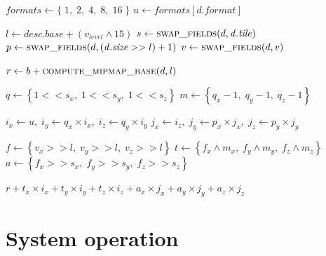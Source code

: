 \begin{algorithm}[H]
\footnotesize
\caption{compute address using array unit descriptor and coordinate vector}
\begin{algorithmic}[1]

  \State $\mathit{formats} \gets \{\;1,\;2,\;4,\;8,\;16\;\}$
  \State $u \gets \mathit{formats}[\mathit{d.format}]$

  \State $l \gets \mathit{desc.base} + (v_{level} \land 15)$
  \State $s \gets \Call{swap\_fields}{d, \mathit{d.tile}}$
  \State $p \gets \Call{swap\_fields}{d, (\mathit{d.size} >> l) + 1}$
  \State $v \gets \Call{swap\_fields}{d,v}$

  \State $r \gets b + \Call{compute\_mipmap\_base}{d,l}$

  \State $q \gets \left\{ 1 << s_x, \; 1 << s_y, \; 1 << s_z \right\}$
  \State $m \gets \left\{  q_x - 1, \;  q_y - 1, \;  q_z - 1 \right\}$

  \State $i_x \gets u,\;
          i_y \gets q_x \times i_x,\;
          i_z \gets q_y \times i_y$
  \State $j_x \gets i_z,\;
          j_y \gets p_x \times j_x,\;
          j_z \gets p_y \times j_y$

  \State $f \gets \left\{ v_x >> l, \; v_y >> l, \; v_z >> l \right\}$
  \State $t \gets
    \left\{ f_x \land m_x, \;
            f_y \land m_y, \;
            f_z \land m_z \right\}$
  \State $a \gets
    \left\{ f_x >> s_x, \;
            f_y >> s_y, \;
            f_z >> s_z \right\}$

  \State \Return $r +
    t_x \times i_x +
    t_y \times i_y +
    t_z \times i_z +
    a_x \times j_x +
    a_y \times j_y +
    a_z \times j_z$

\EndFunction
\end{algorithmic}
\end{algorithm}

%
%
\fi

\chapter{System operation}

